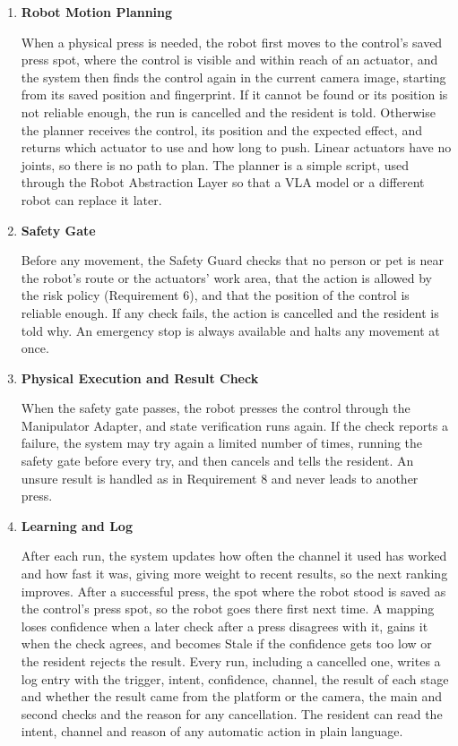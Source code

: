\documentclass[conference]{IEEEtran}
\newcommand{\itemhead}[1]{\item \textbf{#1}\par\nobreak}
\begin{document}
\begin{enumerate}
\itemhead{Robot Motion Planning}
When a physical press is needed, the robot first moves to the control's saved press spot, where the control is visible and within reach of an actuator, and the system then finds the control again in the current camera image, starting from its saved position and fingerprint. If it cannot be found or its position is not reliable enough, the run is cancelled and the resident is told. Otherwise the planner receives the control, its position and the expected effect, and returns which actuator to use and how long to push. Linear actuators have no joints, so there is no path to plan. The planner is a simple script, used through the Robot Abstraction Layer so that a VLA model or a different robot can replace it later.

\itemhead{Safety Gate}
Before any movement, the Safety Guard checks that no person or pet is near the robot's route or the actuators' work area, that the action is allowed by the risk policy (Requirement 6), and that the position of the control is reliable enough. If any check fails, the action is cancelled and the resident is told why. An emergency stop is always available and halts any movement at once.

\itemhead{Physical Execution and Result Check}
When the safety gate passes, the robot presses the control through the Manipulator Adapter, and state verification runs again. If the check reports a failure, the system may try again a limited number of times, running the safety gate before every try, and then cancels and tells the resident. An unsure result is handled as in Requirement 8 and never leads to another press.

\itemhead{Learning and Log}
After each run, the system updates how often the channel it used has worked and how fast it was, giving more weight to recent results, so the next ranking improves. After a successful press, the spot where the robot stood is saved as the control's press spot, so the robot goes there first next time. A mapping loses confidence when a later check after a press disagrees with it, gains it when the check agrees, and becomes Stale if the confidence gets too low or the resident rejects the result. Every run, including a cancelled one, writes a log entry with the trigger, intent, confidence, channel, the result of each stage and whether the result came from the platform or the camera, the main and second checks and the reason for any cancellation. The resident can read the intent, channel and reason of any automatic action in plain language.
\end{enumerate}
\end{document}
